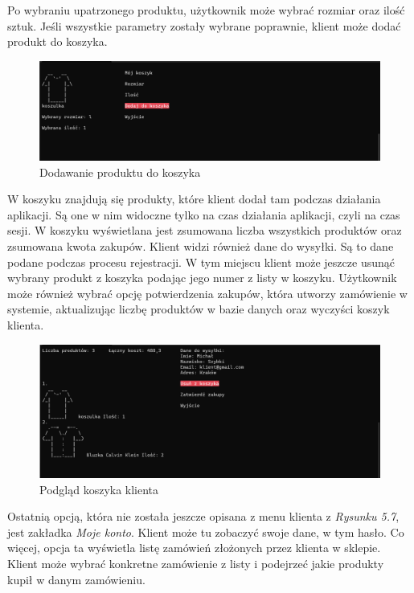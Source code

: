 Po wybraniu upatrzonego produktu, użytkownik może wybrać rozmiar oraz ilość sztuk. Jeśli wszystkie parametry zostały wybrane poprawnie, klient może dodać produkt do koszyka.

\begin{figure}[H]
	\centering
		\includegraphics[width=15cm]{screeny/dodawanie_produktu_do_koszyka.png}
	\caption{\footnotesize Dodawanie produktu do koszyka}
	\label{fig:plotend}
\end{figure}

W koszyku znajdują się produkty, które klient dodał tam podczas działania aplikacji. Są one w nim widoczne tylko na czas działania aplikacji, czyli na czas sesji. W koszyku wyświetlana jest zsumowana liczba wszystkich produktów oraz zsumowana kwota zakupów. Klient widzi również dane do wysyłki. Są to dane podane podczas procesu rejestracji. W tym miejscu klient może jeszcze usunąć wybrany produkt z koszyka podając jego numer z listy w koszyku. Użytkownik może również wybrać opcję potwierdzenia zakupów, która utworzy zamówienie w systemie, aktualizując liczbę produktów w bazie danych oraz wyczyści koszyk klienta.

\begin{figure}[H]
	\centering
		\includegraphics[width=15cm]{screeny/koszyk.png}
	\caption{\footnotesize Podgląd koszyka klienta}
	\label{fig:plotend}
\end{figure}

Ostatnią opcją, która nie została jeszcze opisana z menu klienta z \textit{Rysunku 5.7}, jest zakładka \textit{Moje konto}. Klient może tu zobaczyć swoje dane, w tym hasło. Co więcej, opcja ta wyświetla listę zamówień złożonych przez klienta w sklepie. Klient może wybrać konkretne zamówienie z listy i podejrzeć jakie produkty kupił w danym zamówieniu.

